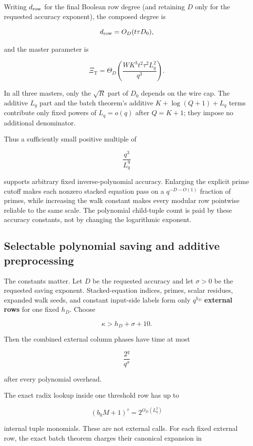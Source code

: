 \documentclass[11pt,letterpaper]{article}
\theoremstyle{definition}
\theoremstyle{remark}
\begin{document}
Writing \(d_{\rm row}\) for the final Boolean row degree (and retaining
\(D\) only for the requested accuracy exponent), the composed degree is

\[
d_{\rm row}=O_D(t\tau D_0),
\]

and the master parameter is

\[
\Xi_{\mathrm T}
{}={}
\Theta_D\left(
\frac{W K^3t^2\tau^2L_q^2}{q^3}
\right).
\]

In all three masters, only the \(\sqrt R\) part of \(D_0\) depends on
the wire cap. The additive \(L_q\) part and the batch
theorem's additive \(K+\log(Q+1)+L_q\) terms contribute
only fixed powers of \(L_q=o(q)\) after \(Q=K+1\); they impose no
additional denominator.

Thus a sufficiently small positive multiple of

\[
\frac{q^3}{L_q^9}
\]

supports arbitrary fixed inverse-polynomial accuracy. Enlarging the
explicit prime cutoff makes each nonzero stacked equation pass on a
\(q^{-D-O(1)}\) fraction of primes, while increasing the walk constant
makes every modular row pointwise reliable to the same scale. The
polynomial child-tuple count is paid by these accuracy constants, not by
changing the logarithmic exponent.

\subsection{Selectable polynomial saving and additive
preprocessing}\label{43-selectable-polynomial-saving-and-additive-preprocessing}

The constants matter. Let \(D\) be the requested accuracy and let
\(\sigma>0\) be the requested saving exponent. Stacked-equation indices,
primes, scalar residues, expanded walk seeds, and constant input-side
labels form only \(q^{h_D}\) \textbf{external rows} for one fixed
\(h_D\). Choose

\[
\kappa>h_D+\sigma+10.
\]

Then the combined external column phases have time at most

\[
\frac{2^q}{q^\sigma}
\]

after every polynomial overhead.

The exact radix lookup inside one threshold row has up to

\[
(b_0M+1)^{\tau}
{}={}
2^{O_D(L_q^2)}
\]

internal tuple monomials. These are not external calls. For each fixed
external row, the exact batch theorem charges their canonical expansion
in
\end{document}
